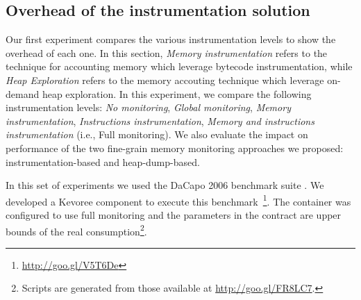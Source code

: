 \subsection{Overhead of the instrumentation solution\label{sec:OverheadFullMonitoring}}
Our first experiment compares the various instrumentation levels to show the overhead of each one. 
In this section, \emph{Memory instrumentation} refers to the technique for accounting memory which leverage bytecode instrumentation, while \textit{Heap Exploration} refers to the memory accouting technique which leverage on-demand heap exploration.
In this experiment, we compare the following instrumentation levels: \emph{No monitoring}, \emph{Global monitoring}, \emph{Memory instrumentation}, \emph{Instructions instrumentation}, \emph{Memory and instructions instrumentation} (i.e., Full monitoring).
We also evaluate the impact on performance of the two fine-grain memory monitoring approaches we proposed: instrumentation-based and heap-dump-based.

In this set of experiments we used the DaCapo 2006 benchmark suite \cite{Blackburn:2006:DBJ:1167473.1167488}. 
We developed a Kevoree component to execute this benchmark~\footnote{\url{http://goo.gl/V5T6De}}.
The container was configured to use full monitoring and the parameters in the contract are upper bounds of the real consumption\footnote{Scripts are generated from those available at \url{http://goo.gl/FR8LC7}.}.

